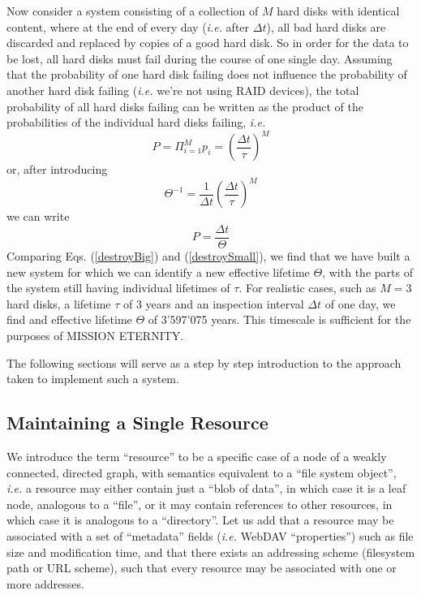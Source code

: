 \documentclass[11pt]{article}
\begin{document}
\begin{mainmatter}
Now consider a system consisting of a collection of $M$ hard disks with identical content, where at the end of every day (\emph{i.e.} after $\Delta t$), all bad hard disks are discarded and replaced by copies of a good hard disk. So in order for the data to be lost, all hard disks must fail during the course of one single day. Assuming that the probability of one hard disk failing does not influence the probability of another hard disk failing (\emph{i.e.} we're not using RAID devices), the total probability of all hard disks failing can be written as the product of the probabilities of the individual hard disks failing, \emph{i.e.}
\begin{equation}
P = \Pi_{i = 1}^M p_i = \left(\frac{\Delta t}{\tau}\right)^M
\end{equation}
or, after introducing
\begin{equation}
\Theta^{-1} = \frac{1}{\Delta t} \left(\frac{\Delta t}{\tau}\right)^M
\end{equation}
we can write
\begin{equation}
P =  \frac{\Delta t}{\Theta}
\label{destroyBig}
\end{equation}
Comparing Eqs. (\ref{destroyBig}) and (\ref{destroySmall}), we find that we have built a new system for which we can identify a new effective lifetime $\Theta$, with the parts of the system still having individual lifetimes of $\tau$. For realistic cases, such as $M = 3$ hard disks, a lifetime $\tau$ of 3 years and an inspection interval $\Delta t$ of one day, we find and effective lifetime $\Theta$ of 3'597'075 years. This timescale is sufficient for the purposes of MISSION ETERNITY.

The following sections will serve as a step by step introduction to the approach taken to implement such a system.


\subsection{Maintaining a Single Resource}
\label{maintain}
We introduce the term ``resource'' to be a specific case of a node of a weakly connected, directed graph, with semantics equivalent to a ``file system object'', \emph{i.e.} a resource may either contain just a ``blob of data'', in which case it is a leaf node, analogous to a ``file'', or it may contain references to other resources, in which case it is analogous to a ``directory''. Let us add that a resource may be associated with a set of ``metadata'' fields (\emph{i.e.} WebDAV ``properties'') such as file size and modification time, and that there exists an addressing scheme (filesystem path or URL scheme), such that every resource may be associated with one or more addresses.


\end{mainmatter}
\end{document}
